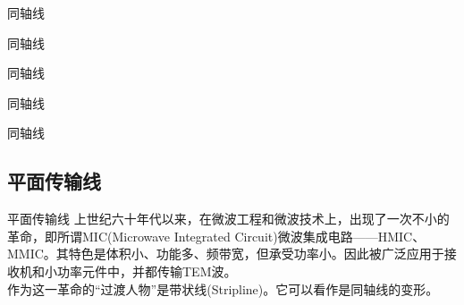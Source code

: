 \begin{frame}{同轴线}

\end{frame}

\begin{frame}{同轴线}

\end{frame}

\begin{frame}{同轴线}

\end{frame}

\begin{frame}{同轴线}

\end{frame}

\begin{frame}{同轴线}

\end{frame}

\subsection{平面传输线}
\begin{frame}{平面传输线}
    上世纪六十年代以来，在微波工程和微波技术上，出现了一次不小的革命，即所谓MIC(Microwave Integrated Circuit)微波集成电路——HMIC、MMIC。其特色是体积小、功能多、频带宽，但承受功率小。因此被广泛应用于接收机和小功率元件中，并都传输TEM波。\\
    作为这一革命的“过渡人物”是带状线(Stripline)。它可以看作是同轴线的变形。
\end{frame}

